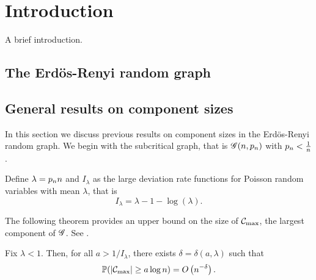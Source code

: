 
\chapter{Introduction}

A brief introduction.
\lipsum[100]

\section{The Erdös-Renyi random graph}

\section{General results on component sizes}

In this section we discuss previous results on component sizes in the Erdös-Renyi random graph.
We begin with the subcritical graph, that is
$\mathscr{G}(n, p_n)$ with $p_n < \frac{1}{n}$.

Define $\lambda = p_n n$ and $I_{\lambda}$ as the large deviation rate functions for Poisson random variables with mean $\lambda$,
that is
\begin{equation}
	I_{\lambda} = \lambda - 1 - \log(\lambda).
\end{equation}

The following theorem provides an upper bound on the size of $\mathcal{C}_{\max}$, the largest component of $\mathscr{G}$.
See \cite[Theorem 4.4, p.125]{vanderHofstad.2016}.
\begin{theorem}
	Fix $\lambda < 1$. 
	Then, for all $a > 1/I_{\lambda}$, 
	there exists $\delta = \delta(a, \lambda)$ such that
	\begin{equation}
		\mathbb{P}( |\mathcal{C}_{\max}| \geq a \log n ) = O\left(n^{-\delta}\right).
	\end{equation}
\end{theorem}

